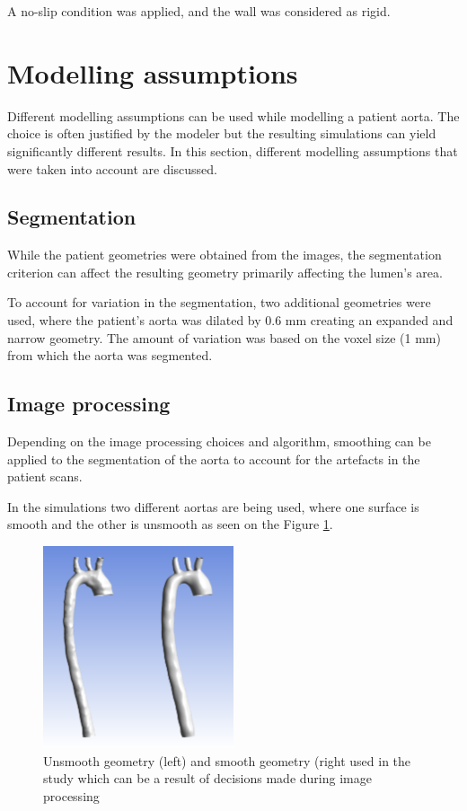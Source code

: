 A no-slip condition was applied, and the wall was considered as rigid. \par

\section{Modelling assumptions}
Different modelling assumptions can be used while modelling a patient aorta. The choice is often justified by the modeler but the resulting simulations can yield significantly different results. In this section, different modelling assumptions that were taken into account are discussed.

\subsection{Segmentation}
While the patient geometries were obtained from the images, the segmentation criterion can affect the resulting geometry primarily affecting the lumen's area. \par

To account for variation in the segmentation, two additional geometries were used, where the patient's aorta was dilated by 0.6 mm creating an expanded and narrow geometry. The amount of variation was based on the voxel size (1 mm) from which the aorta was segmented. \par

\subsection{Image processing}
Depending on the image processing choices and algorithm, smoothing can be applied to the segmentation of the aorta to account for the artefacts in the patient scans. \par

In the simulations two different aortas are being used, where one surface is smooth and the other is unsmooth as seen on the Figure \ref{fig:geometry}.

\begin{figure}[ht!]
    \centering
    \includegraphics[width=0.5\textwidth]{Figures/Geometry.png}
    \caption{Unsmooth geometry (left) and smooth geometry (right used in the study which can be a result of decisions made during image processing}
    \label{fig:geometry}
\end{figure}

